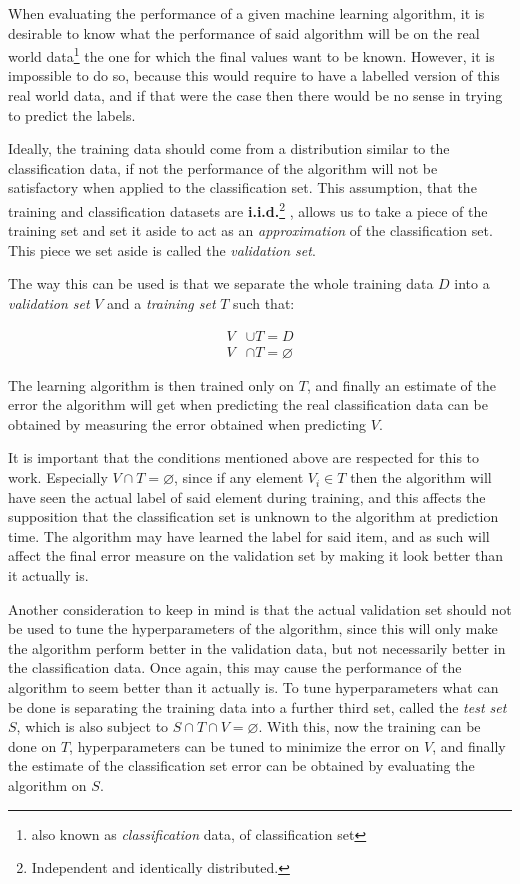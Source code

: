 \documentclass[epsfig,a4paper,11pt,titlepage,twoside,openany]{book}
\begin{document}
When evaluating the performance of a given machine learning algorithm, it is desirable to know what the performance of said algorithm will be on the real world data\footnote{also known as \textit{classification} data, of classification set} the one for which the final values want to be known. However, it is impossible to do so, because this would require to have a labelled version of this real world data, and if that were the case then there would be no sense in trying to predict the labels. 

Ideally, the training data should come from a distribution similar to the classification data, if not the performance of the algorithm will not be satisfactory when applied to the classification set. This assumption, that the training and classification datasets are \textbf{i.i.d.}\footnote{Independent and identically distributed.} \cite{clauset2011brief}, allows us to take a piece of the training set and set it aside to act as an \textit{approximation} of the classification set. This piece we set aside is called the \textit{validation set}. 

The way this can be used is that we separate the whole training data $D$ into a \textit{validation set} $V$ and a \textit{training set} $T$ such that:

\begin{align*}
    V &\cup T = D \\ 
    V &\cap T = \varnothing
\end{align*}

The learning algorithm is then trained only on $T$, and finally an estimate of the error the algorithm will get when predicting the real classification data can be obtained by measuring the error obtained when predicting $V$. 

It is important that the conditions mentioned above are respected for this to work. Especially $V \cap T = \varnothing$, since if any element $V_i \in T$ then the algorithm will have seen the actual label of said element during training, and this affects the supposition that the classification set is unknown to the algorithm at prediction time. The algorithm may have learned the label for said item, and as such will affect the final error measure on the validation set by making it look better than it actually is.

Another consideration to keep in mind is that the actual validation set should not be used to tune the hyperparameters of the algorithm, since this will only make the algorithm perform better in the validation data, but not necessarily better in the classification data. Once again, this may cause the performance of the algorithm to seem better than it actually is. To tune hyperparameters what can be done is separating the training data into a further third set, called the \textit{test set} $S$, which is also subject to $S \cap T \cap V = \varnothing$. With this, now the training can be done on $T$, hyperparameters can be tuned to minimize the error on $V$, and finally the estimate of the classification set error can be obtained by evaluating the algorithm on $S$.
\end{document}
